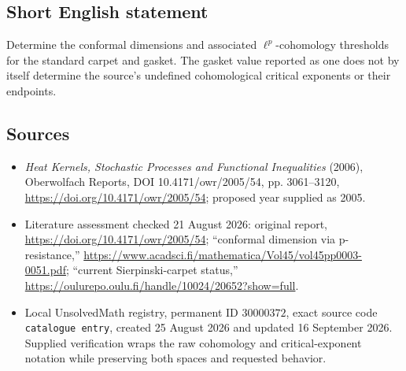 \documentclass[11pt]{article}
\begin{document}
\subsection{Short English statement}
Determine the conformal dimensions and associated $\ell^p$-cohomology thresholds for the standard carpet and gasket. The gasket value reported as one does not by itself determine the source's undefined cohomological critical exponents or their endpoints.
\subsection{Sources}
\begin{itemize}
\item \emph{Heat Kernels, Stochastic Processes and Functional Inequalities} (2006), Oberwolfach Reports, DOI 10.4171/owr/2005/54, pp. 3061--3120, \url{https://doi.org/10.4171/owr/2005/54}; proposed year supplied as 2005.
\item Literature assessment checked 21 August 2026: original report, \url{https://doi.org/10.4171/owr/2005/54}; ``conformal dimension via p-resistance,'' \url{https://www.acadsci.fi/mathematica/Vol45/vol45pp0003-0051.pdf}; ``current Sierpinski-carpet status,'' \url{https://oulurepo.oulu.fi/handle/10024/20652?show=full}.
\item Local UnsolvedMath registry, permanent ID $30000372$, exact source code \texttt{catalogue entry}, created 25 August 2026 and updated 16 September 2026. Supplied verification wraps the raw cohomology and critical-exponent notation while preserving both spaces and requested behavior.
\end{itemize}
\end{document}
